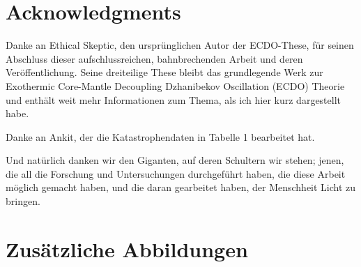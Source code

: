 \documentclass[10pt,twocolumn,letterpaper]{article}
\begin{document}
\section{Acknowledgments}

Danke an Ethical Skeptic, den ursprünglichen Autor der ECDO-These, für seinen Abschluss dieser aufschlussreichen, bahnbrechenden Arbeit und deren Veröffentlichung. Seine dreiteilige These \cite{1} bleibt das grundlegende Werk zur Exothermic Core-Mantle Decoupling Dzhanibekov Oscillation (ECDO) Theorie und enthält weit mehr Informationen zum Thema, als ich hier kurz dargestellt habe.

Danke an Ankit, der die Katastrophendaten in Tabelle 1 bearbeitet hat.

Und natürlich danken wir den Giganten, auf deren Schultern wir stehen; jenen, die all die Forschung und Untersuchungen durchgeführt haben, die diese Arbeit möglich gemacht haben, und die daran gearbeitet haben, der Menschheit Licht zu bringen.

\clearpage
\twocolumn

\section{Zusätzliche Abbildungen}
\end{document}
